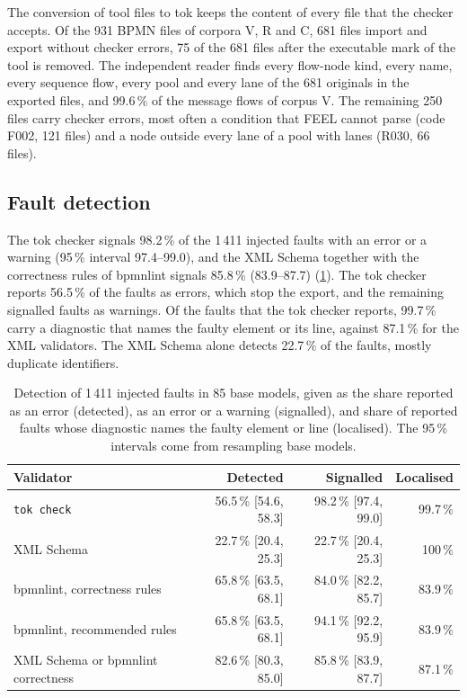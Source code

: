 \documentclass[11pt,a4paper]{article}
\begin{document}
The conversion of tool files to tok keeps the content of every file that the checker accepts. Of the 931 BPMN files of corpora V, R and C, 681 files import and export without checker errors, 75 of the 681 files after the executable mark of the tool is removed. The independent reader finds every flow-node kind, every name, every sequence flow, every pool and every lane of the 681 originals in the exported files, and 99.6\,\% of the message flows of corpus V. The remaining 250 files carry checker errors, most often a condition that FEEL cannot parse (code F002, 121 files) and a node outside every lane of a pool with lanes (R030, 66 files).

\subsection{Fault detection}

The tok checker signals 98.2\,\% of the 1\,411 injected faults with an error or a warning (95\,\% interval 97.4--99.0), and the XML Schema together with the correctness rules of bpmnlint signals 85.8\,\% (83.9--87.7) (\cref{tab:faults}). The tok checker reports 56.5\,\% of the faults as errors, which stop the export, and the remaining signalled faults as warnings. Of the faults that the tok checker reports, 99.7\,\% carry a diagnostic that names the faulty element or its line, against 87.1\,\% for the XML validators. The XML Schema alone detects 22.7\,\% of the faults, mostly duplicate identifiers.

\begin{table}[t]
\centering
\small
\caption{Detection of 1\,411 injected faults in 85 base models, given as the share reported as an error (detected), as an error or a warning (signalled), and share of reported faults whose diagnostic names the faulty element or line (localised). The 95\,\% intervals come from resampling base models.}\label{tab:faults}
\begin{tabular}{@{}l r r r@{}}
\toprule
Validator & Detected & Signalled & Localised\\
\midrule
\texttt{tok check} & 56.5\,\% [54.6, 58.3] & 98.2\,\% [97.4, 99.0] & 99.7\,\%\\
XML Schema & 22.7\,\% [20.4, 25.3] & 22.7\,\% [20.4, 25.3] & 100\,\%\\
bpmnlint, correctness rules & 65.8\,\% [63.5, 68.1] & 84.0\,\% [82.2, 85.7] & 83.9\,\%\\
bpmnlint, recommended rules & 65.8\,\% [63.5, 68.1] & 94.1\,\% [92.2, 95.9] & 83.9\,\%\\
XML Schema or bpmnlint correctness & 82.6\,\% [80.3, 85.0] & 85.8\,\% [83.9, 87.7] & 87.1\,\%\\
\bottomrule
\end{tabular}
\end{table}
\end{document}
